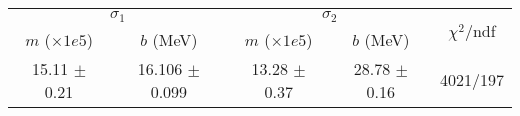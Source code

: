 \begin{tabular}{cc|cc||c}
\multicolumn{2}{c|}{$\sigma_1$} & \multicolumn{2}{|c}{$\sigma_2$}  & \multirow{2}{*}{$\chi^2/$ndf}\\
$m$ ($\times1e5$) & $b$ (MeV) & $m$ ($\times1e5$) & $b$ (MeV)  & \\
\hline
15.11 $\pm$ 0.21 & 16.106 $\pm$ 0.099 & 13.28 $\pm$ 0.37 & 28.78 $\pm$ 0.16 & 4021/197\\
\end{tabular}
